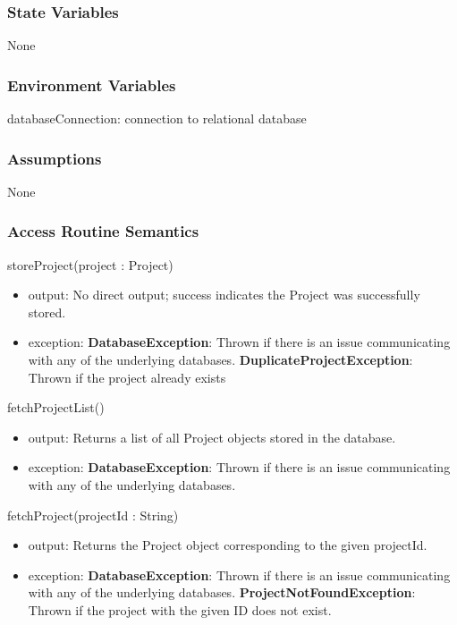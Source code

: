 \documentclass[12pt, titlepage]{article}
\begin{document}
    \subsubsection{State Variables}
        None

    \subsubsection{Environment Variables}
        databaseConnection: connection to relational database

    \subsubsection{Assumptions}
        None

    \subsubsection{Access Routine Semantics}
        \noindent storeProject(project : Project)
        \begin{itemize}
            \item output: No direct output; success indicates the Project was successfully stored.
            \item exception: \textbf{DatabaseException}: Thrown if there is an issue communicating with any of the underlying databases. \textbf{DuplicateProjectException}: Thrown if the project already exists
        \end{itemize}
        \noindent fetchProjectList()
        \begin{itemize}
            \item output: Returns a list of all Project objects stored in the database.
            \item exception: \textbf{DatabaseException}: Thrown if there is an issue communicating with any of the underlying databases. 
        \end{itemize}
        \noindent fetchProject(projectId : String)
        \begin{itemize}
            \item output: Returns the Project object corresponding to the given projectId.
            \item exception: \textbf{DatabaseException}: Thrown if there is an issue communicating with any of the underlying databases. \textbf{ProjectNotFoundException}: Thrown if the project with the given ID does not exist.
        \end{itemize}
\end{document}
